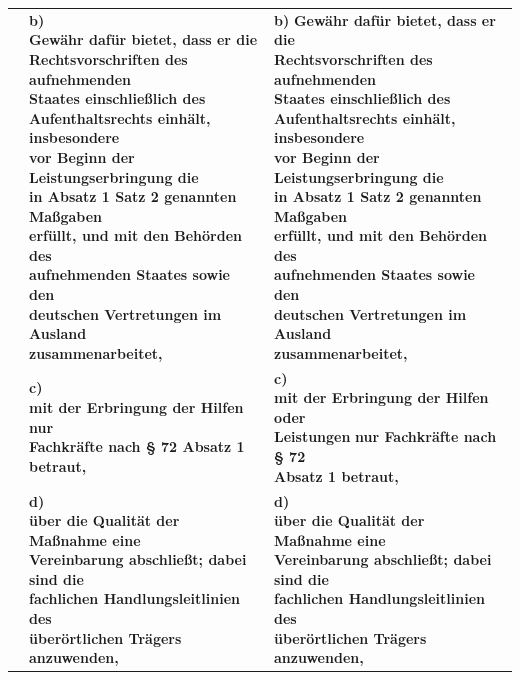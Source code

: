 \documentclass[10pt,a4paper,landscape]{article}
\begin{document}
\begin{longtable}{|L{8.2cm}|L{8.2cm}|L{8.2cm}|}
\hhline{|---|}
 & \textbf{b)   \newline Gewähr dafür bietet, dass er die  \newline Rechtsvorschriften des aufnehmenden  \newline Staates einschließlich des  \newline Aufenthaltsrechts einhält, insbesondere  \newline vor Beginn der Leistungserbringung die  \newline in Absatz 1 Satz 2 genannten Maßgaben  \newline erfüllt, und mit den Behörden des  \newline aufnehmenden Staates sowie den  \newline deutschen Vertretungen im Ausland  \newline zusammenarbeitet, } & \textbf{b)  } \textbf{Gewähr dafür bietet, dass er die  \newline Rechtsvorschriften des aufnehmenden  \newline Staates einschließlich des  \newline Aufenthaltsrechts einhält, insbesondere  \newline vor Beginn der Leistungserbringung die  \newline in Absatz 1 Satz 2 genannten Maßgaben  \newline erfüllt, und mit den Behörden des  \newline aufnehmenden Staates sowie den  \newline deutschen Vertretungen im Ausland  \newline zusammenarbeitet, } \\
\hhline{|---|}
 & \textbf{c)   \newline mit der Erbringung der Hilfen nur  \newline Fachkräfte nach \S{} 72 Absatz 1 betraut, } & \textbf{c)   \newline mit der Erbringung der Hilfen }\textbf{\textcolor{diffgreen}{oder  \newline Leistungen}}\textbf{ nur Fachkräfte nach \S{} 72  \newline Absatz 1 betraut, } \\
\hhline{|---|}
 & \textbf{d)   \newline über die Qualität der Maßnahme eine  \newline Vereinbarung abschließt; dabei sind die  \newline fachlichen Handlungsleitlinien des  \newline überörtlichen Trägers anzuwenden, } & \textbf{d)   \newline über die Qualität der Maßnahme eine  \newline Vereinbarung abschließt; dabei sind die  \newline fachlichen Handlungsleitlinien des  \newline überörtlichen Trägers anzuwenden, } \\

\end{longtable}
\end{document}
